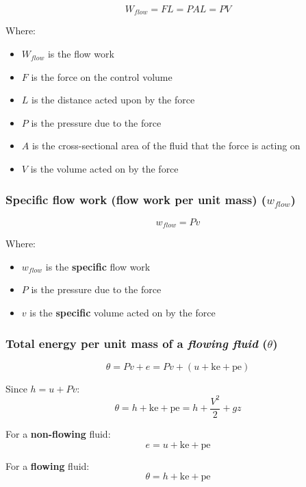 \documentclass[11pt]{article}
\begin{document}
\[W_{flow} = FL = PAL = PV\]

Where:
\begin{itemize}
\item \(W_{flow}\) is the flow work
\item \(F\) is the force on the control volume
\item \(L\) is the distance acted upon by the force
\item \(P\) is the pressure due to the force
\item \(A\) is the cross-sectional area of the fluid that the force is acting on
\item \(V\) is the volume acted on by the force
\end{itemize}

\subsubsection{Specific flow work (flow work per unit mass) (\(w_{flow}\))}
\label{sec:orgdc94f0f}
\[w_{flow} = Pv\]

Where:
\begin{itemize}
\item \(w_{flow}\) is the \textbf{specific} flow work
\item \(P\) is the pressure due to the force
\item \(v\) is the \textbf{specific} volume acted on by the force
\end{itemize}

\subsubsection{Total energy per unit mass of a \emph{flowing fluid} (\(\theta\))}
\label{sec:org1097ae1}
\[\theta = Pv + e = Pv + (u + \text{ke} + \text{pe})\]

Since \(h = u + Pv\):
\[\theta = h + \text{ke} + \text{pe} = h + \frac{V^2}{2} + gz\]

For a \textbf{non-flowing} fluid:
\[e = u + \text{ke} + \text{pe}\]

For a \textbf{flowing} fluid:
\[\theta = h + \text{ke} + \text{pe}\]
\end{document}
